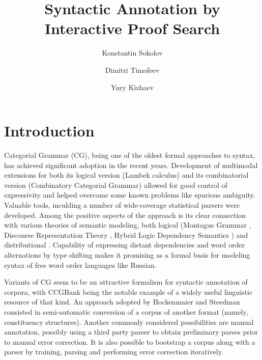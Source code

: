 \documentclass[a4paper]{article}
\theoremstyle{example-style}
\begin{document}
\title{Syntactic Annotation by Interactive Proof Search}
\author[1]{Konstantin Sokolov}
\author[2]{Dimitri Timofeev}
\author[3]{Yury Kizhaev}
\date{}

\maketitle

\section{Introduction}

Categorial Grammar (CG), being one of the oldest formal approaches to syntax, has achieved significant adoption in the recent years. Development of multimodal extensions for both its logical version (Lambek calculus) and its combinatorial version (Combinatory Categorial Grammar) allowed for good control of expressivity and helped overcome some known problems like spurious ambiguity. Valuable tools, inculding a number of wide-coverage statistical parsers \parencite{curran2007linguistically,white2008open} were developed. Among the positive aspects of the approach is its clear connection with various theories of semantic modeling, both logical (Montague Grammar \parencite{steedman2000syntactic}, Discourse Representation Theory \parencite{bos2008wide}, Hybrid Logic Dependency Semantics \parencite{baldridge2002coupling}) and distributional \parencite{maillard2014type}. Capability of expressing distant dependencies and word order alternations by type shifting makes it promising as a formal basis for modeling syntax of free word order languages like Russian.

Variants of CG seem to be an attractive formalism for syntactic annotation of corpora, with CCGBank \parencite{hockenmaier2007ccgbank} being the notable example of a widely useful linguistic resource of that kind. An approach adopted by Hockenmaier and Steedman consisted in semi-automatic conversion of a corpus of another format (namely, constituency structures). Another commonly considered possibilities are manual annotation, possibly using a third party parser to obtain preliminary parses prior to manual error correction. It is also possible to bootstrap a corpus along with a parser by training, parsing and performing error correction iteratively.
\end{document}
